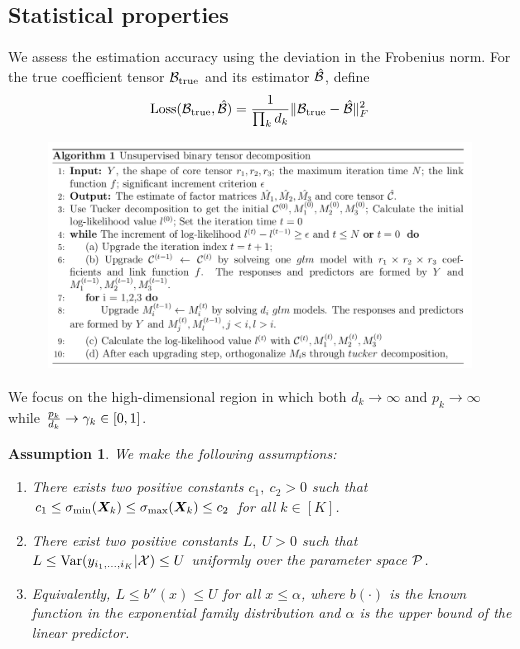 \documentclass[twoside]{article}
\theoremstyle{plain}
\newtheorem{assumption}{Assumption}
\theoremstyle{definition}
\begin{document}
\subsection{Statistical properties}
We assess the estimation accuracy using the deviation in the Frobenius norm. For the true coefficient tensor $\mathcal{B}_{\text{true}}$ and its estimator $\hat {\mathcal{B}}$, define
\[
\text{Loss}(\mathcal{B}_{\text{true}}, \hat {\mathcal{B}})={ 1 \over \prod_k d_k} \lVert\mathcal{B}_{\text{true}}- \hat {\mathcal{B}}\rVert_F^2
\]

\begin{figure}
\begin{center}
\includegraphics[width=17.5cm]{unsupervised.png}
  \end{center}
  \end{figure}
  
We focus on the high-dimensional region in which both $d_k\to \infty$ and $p_k\to\infty$ while ${p_k\over d_k} \to \gamma_k \in[0,1]$. 
\begin{assumption}\label{ass}We make the following assumptions:
\vspace{-.5cm}
\begin{enumerate}
\item [1.] There exists two positive constants $c_1,\ c_2>0$ such that $c_1\leq \sigma_{\min}(\bm X_k)\leq  \sigma_{\max}(\bm X_k)\leq c_2$ for all $k\in[K]$.
\item [2.] There exist two positive constants $L,\ U>0$ such that $L\leq \text{Var}(y_{i_1,\ldots,i_K}|\mathcal{X})\leq U$ uniformly over the parameter space $\mathcal{P}$. 
\item [2'.] Equivalently, $L\leq b''(x) \leq U$ for all $x\leq \alpha$, where $b(\cdot)$ is the known function in the exponential family distribution and $\alpha$ is the upper bound of the linear predictor. 
\end{enumerate}
\end{assumption}
\end{document}
